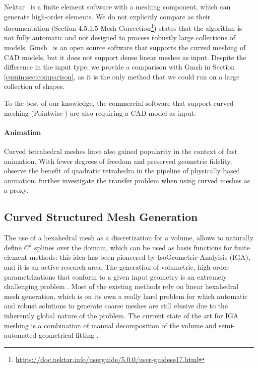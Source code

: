 Nektar~\cite{moxeynekmesh} is a finite element software with a meshing component, which can generate high-order elements. We do not explicitly compare as their documentation (Section 4.5.1.5 Mesh Correction\footnote{\url{https://doc.nektar.info/userguide/5.0.0/user-guidese17.html}}) states that the algorithm is not fully automatic and not designed to process robustly large collections of models.
Gmsh~\cite{Geuzaine:2009:gmsh} is an open source software that supports the curved meshing of CAD models, but it does not support dense linear meshes as input. Despite the difference in the input type, we provide a comparison with Gmsh in Section \ref{cumin:sec:comparison}, as it is the only method that we could run on a large collection of shapes.

To the best of our knowledge, the commercial software that support curved meshing (Pointwise \cite{pointwise,Steve2016}) are also requiring a CAD model as input.

\paragraph{Animation}
Curved tetrahedral meshes have also gained popularity in the context of fast animation. With fewer degrees of freedom and preserved geometric fidelity, 
\cite{mezger2007finite} observe the benefit of quadratic tetrahedra in the pipeline of physically based animation.
\cite{Suwelack2013} further investigate the transfer problem when using curved meshes as a proxy.

\subsection{Curved Structured Mesh Generation}

The use of a hexahedral mesh as a discretization for a volume, allows to naturally define $C^k$ splines over the domain, which can be used as basis functions for finite element methods: this idea has been pioneered by 
IsoGeometric Analyisis (IGA), and it is an active research area. The generation of volumetric, high-order parametrizations that conform to a given input geometry is an extremely challenging problem \cite{Sorger:2014,Peir2015OnCH}. Most of the existing methods rely on linear hexahedral mesh generation, which is on its own a really hard problem for which automatic and robust solutions to generate coarse meshes are still elusive \cite{Yufei:2012,Gao:2019,Guo2020Cut,Palmer:2020,Zhang:2020,marschner2020hexahedral} due to the inherently global nature of the problem. 
%
The current state of the art for IGA meshing is a combination of manual decomposition of the volume and semi-automated geometrical fitting \cite{yu2020hexgen,coreform}.

